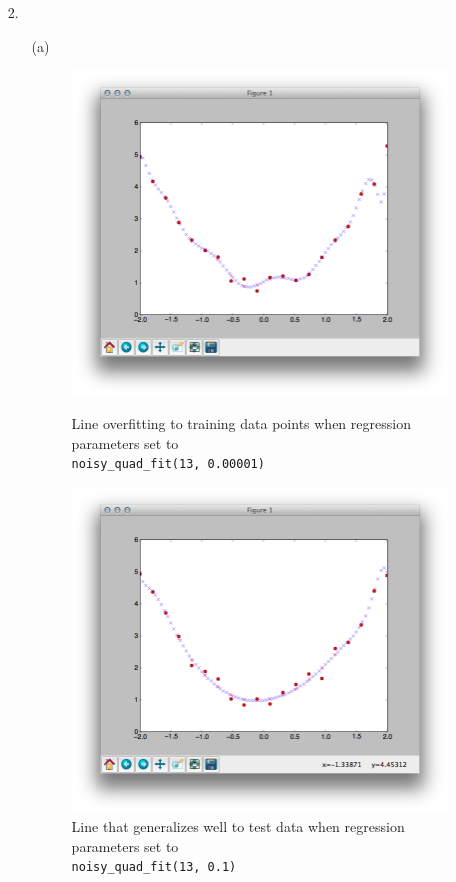 \documentclass{article}
\begin{document}
\begin{enumerate}
\begin{enumerate}
	\end{enumerate}
\newpage

\item[2.] 
	\begin{enumerate}
	\item[(a)] $\:$ \\
		\begin{figure}[!htb]
		  \includegraphics[width=\linewidth]{../images/Overfitting.png}
		  \caption{Line overfitting to training data points when regression parameters set to \\ \texttt{noisy\_quad\_fit(13, 0.00001)}}
		\endminipage\hfill
		  \includegraphics[width=\linewidth]{../images/Generalizable.png}
		  \caption{Line that generalizes well to test data when regression parameters set to \\ \texttt{noisy\_quad\_fit(13, 0.1)}}
		\endminipage\hfill
		\end{figure}


\end{enumerate}
\end{enumerate}
\end{document}
